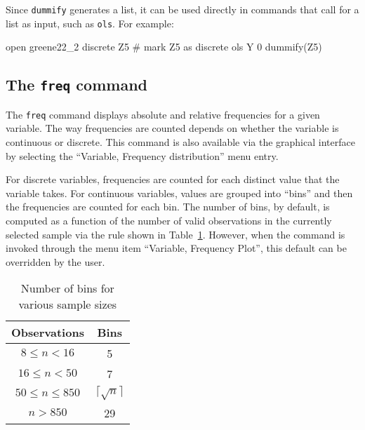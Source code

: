 Since \texttt{dummify} generates a list, it can be used directly
in commands that call for a list as input, such as \texttt{ols}.  For
example:
\begin{code}
open greene22_2
discrete Z5 # mark Z5 as discrete
ols Y 0 dummify(Z5)
\end{code}

\subsection{The \texttt{freq} command}
\label{discr-freq}

The \texttt{freq} command displays absolute and relative frequencies
for a given variable. The way frequencies are counted depends on
whether the variable is continuous or discrete.  This command is also
available via the graphical interface by selecting the ``Variable,
Frequency distribution'' menu entry.

For discrete variables, frequencies are counted for each distinct
value that the variable takes. For continuous variables, values are
grouped into ``bins'' and then the frequencies are counted for each
bin. The number of bins, by default, is computed as a function of the
number of valid observations in the currently selected sample via the
rule shown in Table~\ref{tab:bins}. However, when the command is
invoked through the menu item ``Variable, Frequency Plot'', this
default can be overridden by the user.

\begin{table}[htbp]
  \centering
  \begin{tabular}{cc}
\hline
  Observations & Bins \\
\hline
  $8 \le n < 16$ & 5 \\
  $16 \le n < 50 $ & 7 \\
  $50 \le n \le 850 $ & $\lceil \sqrt{n} \rceil$  \\
  $n > 850 $ & 29 \\
\hline
\end{tabular}
\caption{Number of bins for various sample sizes}
\label{tab:bins}
\end{table}

